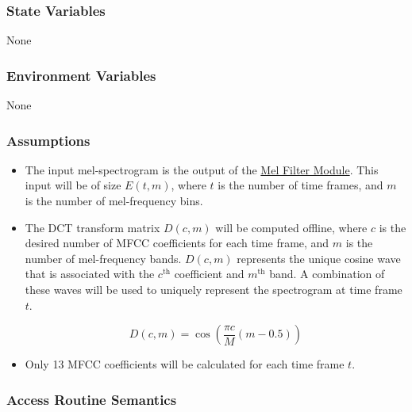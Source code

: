 \documentclass[12pt, titlepage]{article}
\begin{document}
\subsubsection{State Variables}

None

\subsubsection{Environment Variables}

None

\subsubsection{Assumptions}

\begin{itemize}
  \item The input mel-spectrogram is the output of the
  \hyperref[MG-mMelFilter]{Mel Filter Module}. This input will be of size $E(t,
  m)$, where $t$ is the number of time frames, and $m$ is the number of
  mel-frequency bins. 
  \item The DCT transform matrix $D(c,m)$ will be computed offline, where $c$ is
  the desired number of MFCC coefficients for each time frame, and $m$ is the
  number of mel-frequency bands. $D(c,m)$ represents the unique cosine wave that
  is associated with the $c^{\text{th}}$ coefficient and $m^{\text{th}}$ band. A
  combination of these waves will be used to uniquely represent the spectrogram
  at time frame $t$. 

    \[
    D(c,m) = \cos\!\left(\frac{\pi c}{M}(m - 0.5)\right)
    \]
  
  \item Only 13 MFCC coefficients will be calculated for each time frame $t$. 
  
\end{itemize}

\subsubsection{Access Routine Semantics}
\end{document}
